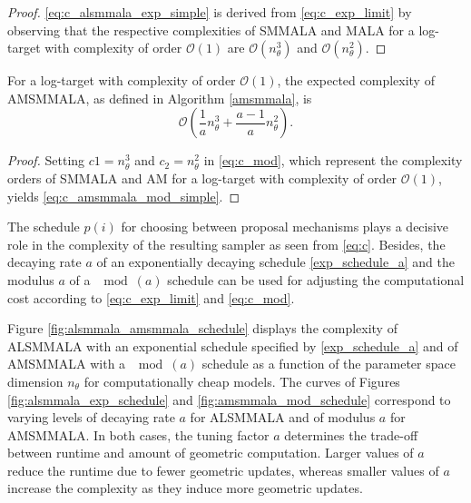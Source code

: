 \documentclass[twoside,11pt]{article}
\begin{document}
\begin{proof}
	\eqref{eq:c_alsmmala_exp_simple} is derived from \eqref{eq:c_exp_limit} by observing that the respective complexities of 
	SMMALA and MALA for a log-target with complexity of order $\mathcal{O}(1)$ are $\mathcal{O}(n_{\theta}^3)$ and 
	$\mathcal{O}(n_{\theta}^2)$.
\end{proof}

\begin{lemma}
	For a log-target with complexity of order $\mathcal{O}(1)$, the expected complexity of AMSMMALA, as defined in Algorithm 
	\ref{amsmmala}, is
	\begin{equation}
	\label{eq:c_amsmmala_mod_simple}
	\mathcal{O}\left(
	\dfrac{1}{a}n_{\theta}^3+
	\dfrac{a-1}{a}n_{\theta}^2
	\right).
	\end{equation}
\end{lemma}

\begin{proof}
	Setting $c1=n_{\theta}^3$ and $c_2=n_{\theta}^2$ in \eqref{eq:c_mod}, which represent the complexity orders of SMMALA and 
	AM for a log-target with complexity of order $\mathcal{O}(1)$, yields \eqref{eq:c_amsmmala_mod_simple}.
\end{proof}

The schedule $p(i)$ for choosing between proposal mechanisms plays a decisive role in the complexity of the resulting sampler
as seen from \eqref{eq:c}. Besides, the decaying rate $a$ of an exponentially decaying schedule \eqref{exp_schedule_a} and 
the modulus $a$ of a $\mod{(a)}$ schedule can be used for adjusting the computational cost according to 
\eqref{eq:c_exp_limit} and \eqref{eq:c_mod}.

Figure \ref{fig:alsmmala_amsmmala_schedule} displays the complexity of ALSMMALA with an exponential schedule specified by
\eqref{exp_schedule_a} and of AMSMMALA with a $\mod{(a)}$ schedule as a function of the parameter space dimension 
$n_{\theta}$ for computationally cheap models. The curves of Figures \ref{fig:alsmmala_exp_schedule} and 
\ref{fig:amsmmala_mod_schedule} correspond to varying levels of decaying rate $a$ for ALSMMALA and of modulus $a$ for 
AMSMMALA. In both cases, the tuning factor $a$ determines the trade-off between runtime and amount of geometric computation. 
Larger values of $a$ reduce the runtime due to fewer geometric updates, whereas smaller values of $a$ increase the 
complexity as they induce more geometric updates.
\end{document}
